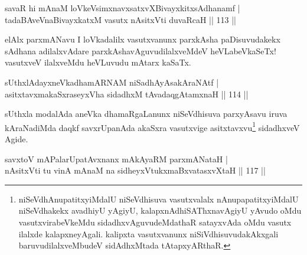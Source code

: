 \begin{shl}
savaR hi mAnaM loVkeV\s simxnavxsatxvXBivayxkitxsAdhanamf |\\
tadaBAveV\s naBivayxkatxM vasutx nAsitxVti duvaRcaH \hfill || 113 ||
\end{shl}

\begin{artha}
elAlx parxmANavu I loVkadalilx vasutxvanunx parxkAsha paDisuvudakekx sAdhana adilalxvAdare parxkAshavAguvudilalxveMdeV heVLabeVkaSeTx! vasutxveV ilalxveMdu heVLuvudu mAtarx kaSaTx.
\end{artha}


\begin{shl}
sUthxlAdayxneVkadhamARNAM niSadhAyAsakAraNAtf |\\
asitxtavxmakaSxraseyxVha sidadhxM tAvadaqgAtamxnaH \hfill || 114 ||
\end{shl}

\begin{artha}
sUthxla modalAda aneVka dhamaRgaLanunx niSeVdhisuva parxyAsavu iruva kAraNadiMda daqkf savxrUpanAda akaSxra vasutxvige asitxtavxvu\footnote[3]{niSeVdhAnupatitxyiMdalU niSeVdhisuva vasutxvalalx nAnupapatitxyiMdalU niSeVdhakekx avadhiyU yAgiyU, kalapxnAdhiSAThxnavAgiyU yAvudo oMdu vasutxvirabeVkeMdu sidadhxvAguvudeMdathaR satayxvAda oMdu vasutx ilalxde kalapxneyAgali. kalipxta vasutxvanunx niSiVdhisuvudakAkxgali baruvudilalxveMbudeV sidAdhxMtada tAtapxyARthaR.} sidadhxveV Agide.
\end{artha}



\begin{shl}
savxtoV mAPalarUpatAvxnanx mAkAyaRM parxmANataH |\\
nAsitxVti tu vinA mAnaM na sidheyxVtukxmaBxvatasxvXtaH \hfill || 117 ||
\end{shl}

